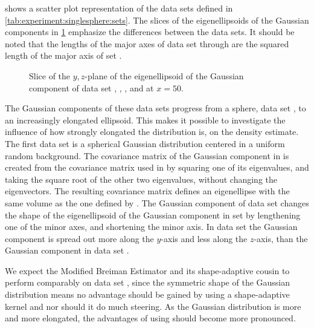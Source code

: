 
 shows a scatter plot representation of the data sets defined in \cref{tab:experiment:singlesphere:sets}. The slices of the eigenellipsoids of the Gaussian components in \cref{fig:experiment:singlesphere:projection} emphasize the differences between the data sets. It should be noted that the lengths of the major axes of data set \baakmanOne through \baakmanFive are the squared length of the major axis of set \ferdosiOne.

\begin{figure}[b!]
	\centering
	
	\caption{Slice of the $y,z$-plane of the eigenellipsoid of the Gaussian component of data set%
		 \ferdosiOne, %
		 \baakmanOne, %
		 \baakmanFour, and %
		 \baakmanFive %
		 at $x = 50$.}
	\label{fig:experiment:singlesphere:projection}
\end{figure}

The Gaussian components of these data sets progress from a sphere, \ie data set \ferdosiOne, to an increasingly elongated ellipsoid. This makes it possible to investigate the influence of how strongly elongated the distribution is, on the density estimate.
	The first data set is a spherical Gaussian distribution centered in a uniform random background.
	The covariance matrix of the Gaussian component in \baakmanOne is created from the covariance matrix used in \ferdosiOne by squaring one of its eigenvalues, and taking the square root of the other two eigenvalues, without changing the eigenvectors. The resulting covariance matrix defines an eigenellipse with the same volume as the one defined by \ferdosiOne.
	The Gaussian component of data set \baakmanFour changes the shape of the eigenellipsoid of the Gaussian component in set \ferdosiOne by lengthening one of the minor axes, and shortening the minor axis.
	In data set \baakmanFive the Gaussian component is spread out more along the $y$-axis and less along the $z$-axis, than the Gaussian component in data set \baakmanFour.

	We expect the Modified Breiman Estimator and its shape-adaptive cousin to perform comparably on data set \ferdosiOne, since the symmetric shape of the Gaussian distribution means no advantage should be gained by using a shape-adaptive kernel and nor should it do much steering.
	As the Gaussian distribution is more and more elongated, the advantages of using \sambe should become more pronounced.